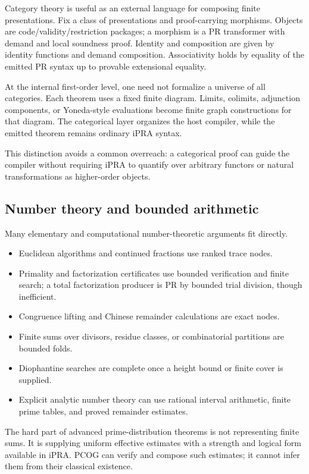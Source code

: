 Category theory is useful as an external language for composing finite
presentations.  Fix a class of presentations and proof-carrying morphisms.
Objects are code/validity/restriction packages; a morphism is a PR transformer
with demand and local soundness proof.  Identity and composition are given by
identity functions and demand composition.  Associativity holds by equality
of the emitted PR syntax up to provable extensional equality.

At the internal first-order level, one need not formalize a universe of all
categories.  Each theorem uses a fixed finite diagram.  Limits, colimits,
adjunction components, or Yoneda-style evaluations become finite graph
constructions for that diagram.  The categorical layer organizes the host
compiler, while the emitted theorem remains ordinary iPRA syntax.

This distinction avoids a common overreach: a categorical proof can guide the
compiler without requiring iPRA to quantify over arbitrary functors or natural
transformations as higher-order objects.

\subsection{Number theory and bounded arithmetic}

Many elementary and computational number-theoretic arguments fit directly.

\begin{itemize}
\item Euclidean algorithms and continued fractions use ranked trace nodes.
\item Primality and factorization certificates use bounded verification and
finite search; a total factorization producer is PR by bounded trial division,
though inefficient.
\item Congruence lifting and Chinese remainder calculations are exact nodes.
\item Finite sums over divisors, residue classes, or combinatorial partitions
are bounded folds.
\item Diophantine searches are complete once a height bound or finite cover is
supplied.
\item Explicit analytic number theory can use rational interval arithmetic,
finite prime tables, and proved remainder estimates.
\end{itemize}

The hard part of advanced prime-distribution theorems is not representing
finite sums.  It is supplying uniform effective estimates with a strength and
logical form available in iPRA.  PCOG can verify and compose such estimates;
it cannot infer them from their classical existence.

